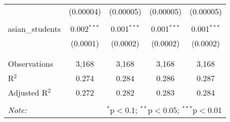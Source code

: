\begin{table}[!htbp]
\begin{tabular}{@{\extracolsep{-2pt}}lcccc}
  & (0.00004) & (0.00005) & (0.00005) & (0.00005) \\ 
  & & & & \\ 
 asian\_students & 0.002$^{***}$ & 0.001$^{***}$ & 0.001$^{***}$ & 0.001$^{***}$ \\ 
  & (0.0001) & (0.0002) & (0.0002) & (0.0002) \\ 
  & & & & \\ 
\hline \\[-1.8ex] 
Observations & 3,168 & 3,168 & 3,168 & 3,168 \\ 
R$^{2}$ & 0.274 & 0.284 & 0.286 & 0.287 \\ 
Adjusted R$^{2}$ & 0.272 & 0.282 & 0.283 & 0.284 \\ 
\hline 
\hline \\[-1.8ex] 
\textit{Note:}  & \multicolumn{4}{r}{$^{*}$p$<$0.1; $^{**}$p$<$0.05; $^{***}$p$<$0.01} \\ 
\end{tabular} 
\end{table} 
